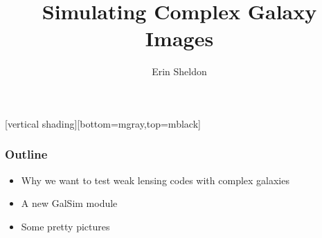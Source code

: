 \documentclass{beamer}
\title{Simulating Complex Galaxy Images}
\author{Erin Sheldon}
\institute{Brookhaven National Laboratory}
\begin{document}
\frame{\titlepage}


[vertical shading][bottom=mgray,top=mblack]

\frame
{
    \frametitle{Outline}

 
    \begin{itemize}

        \item Why we want to test weak lensing codes with complex galaxies

        \item A new GalSim module

        \item Some pretty pictures

    \end{itemize}

}
\end{document}
